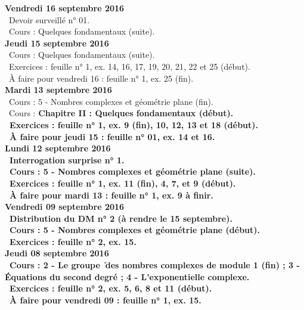 \documentclass[12pt,a4paper]{article}
\begin{document}
\noindent\textbf{Vendredi 16 septembre 2016}\\
\bu\ Devoir surveillé n° 01.\\
\bu\ Cours : Quelques fondamentaux (suite).\vspace{.4cm}\\

\noindent\textbf{Jeudi 15 septembre 2016}\\
\bu\ Cours : Quelques fondamentaux (suite).\\
\bu\ Exercices : feuille n° 1, ex. 14, 16, 17, 19, 20, 21, 22 et 25 (début).\\
\bu\ À faire pour vendredi 16 : feuille n° 1, ex. 25 (fin).\vspace{.4cm}\\
 
\noindent\textbf{\bf Mardi 13 septembre 2016}\\
\bu\ Cours : 5 - Nombres complexes et géométrie plane (fin).\\
\bu\ Cours : \bf Chapitre II \rm : Quelques fondamentaux (début).\\
\bu\ Exercices : feuille n° 1, ex. 9 (fin), 10, 12, 13 et 18 (début).\\
\bu\ À faire pour jeudi 15 : feuille n° 01, ex. 14 et 16.\vspace{.4cm}\\

\noindent\textbf{\bf Lundi 12 septembre 2016}\\
\bu\ Interrogation surprise n° 1.\\
\bu\ Cours : 5 - Nombres complexes et géométrie plane (suite).\\
\bu\ Exercices : feuille n° 1, ex. 11 (fin), 4, 7, et 9 (début).\\
\bu\ À faire pour mardi 13 : feuille n° 1, ex. 9 à finir.\vspace{.4cm}\\
 
\noindent\textbf{Vendredi 09 septembre 2016}\\
\bu\ Distribution du DM n° 2 (à rendre le 15 septembre).\\
\bu\ Cours : 5 - Nombres complexes et géométrie plane (début).\\
\bu\ Exercices : feuille n° 2, ex. 15.\vspace{.4cm}\\

\noindent\textbf{\bf Jeudi 08 septembre 2016}\\
\bu\ Cours : 2 - Le groupe \U\ des nombres complexes de 
module 1 (fin) ; 3 - Équations du second degré ; 4 - L'exponentielle complexe.\\
\bu\ Exercices : feuille n° 2, ex. 5, 6, 8 et 11 (début).\\
\bu\ À faire pour vendredi 09 : feuille n° 1, ex. 15.\vspace{.4cm}\\
  
\end{document}
